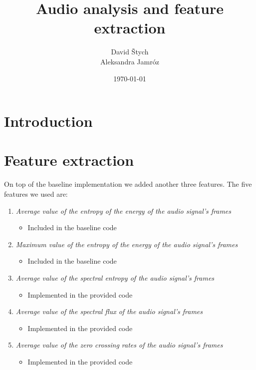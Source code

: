 \documentclass{article}
\title{Audio analysis and feature extraction}
\author{David Štych\\ Aleksandra Jamróz}
\date{\today{}}
\begin{document}
\maketitle

\section*{Introduction}


\section*{Feature extraction}
On top of the baseline implementation we added another three features. The five features we used are:
\begin{enumerate}
\item \textit{Average value of the entropy of the energy of the audio signal’s frames}
\begin{itemize}
\item Included in the baseline code
\end{itemize}
\item \textit{Maximum value of the entropy of the energy of the audio signal’s frames}
\begin{itemize}
\item Included in the baseline code
\end{itemize}
\item \textit{Average value of the spectral entropy of the audio signal’s frames}
\begin{itemize}
\item Implemented in the provided code
\end{itemize}
\item \textit{Average value of the spectral flux of the audio signal’s frames}
\begin{itemize}
\item Implemented in the provided code
\end{itemize}
\item \textit{Average value of the zero crossing rates of the audio signal’s frames}
\begin{itemize}
\item Implemented in the provided code
\end{itemize}


\end{enumerate}
\end{document}
